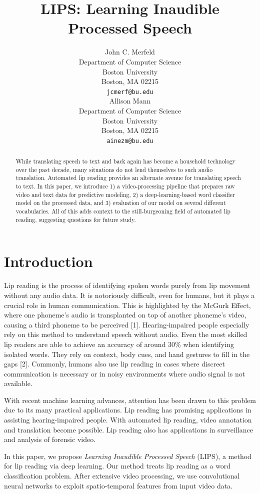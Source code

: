 \documentclass{article}
\title{LIPS: Learning Inaudible Processed Speech}
\author{%
  John C. Merfeld \\
  Department of Computer Science\\
  Boston University\\
  Boston, MA 02215 \\
  \texttt{jcmerf@bu.edu} \\
	\And
  Allison Mann \\
  Department of Computer Science\\
  Boston University\\
  Boston, MA 02215 \\
  \texttt{ainezm@bu.edu} \\
}
\begin{document}
\maketitle

\begin{abstract}
While translating speech to text and back again has become a household technology over the past decade, many situations do not lend themselves to such audio translation. Automated lip reading provides an alternate avenue for translating speech to text. In this paper, we introduce 1) a video-processing pipeline that prepares raw video and text data for predictive modeling, 2) a deep-learning-based word classifier model on the processed data, and 3) evaluation of our model on several different vocabularies. All of this adds context to the still-burgeoning field of automated lip reading, suggesting questions for future study.
\end{abstract}

\section{Introduction}

Lip reading is the process of identifying spoken words purely from lip movement without any audio data. It is notoriously difficult, even for humans, but it plays a crucial role in human communication. This is highlighted by the McGurk Effect, where one phoneme's audio is transplanted on top of another phoneme's video, causing a third phoneme to be perceived [1]. Hearing-impaired people especially rely on this method to understand speech without audio. Even the most skilled lip readers are able to achieve an accuracy of around 30\% when identifying isolated words. They rely on context, body cues, and hand gestures to fill in the gaps [2]. Commonly, humans also use lip reading in cases where discreet communication is necessary or in noisy environments where audio signal is not available.

With recent machine learning advances, attention has been drawn to this problem due to its many practical applications. Lip reading has promising applications in assisting hearing-impaired people. With automated lip reading, video annotation and translation become possible. Lip reading also has applications in surveillance and analysis of forensic video.

In this paper, we propose \textit{Learning Inaudible Processed Speech} (LIPS), a method for lip reading via deep learning. Our method treats lip reading as a word classification problem. After extensive video processing, we use convolutional neural networks to exploit spatio-temporal features from input video data.
\end{document}
